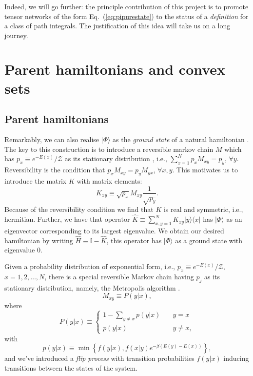 \documentclass[twocolumn,lengthcheck,superscriptaddress]{revtex4-1}
\theoremstyle{definition}
\theoremstyle{remark}
\begin{document}
Indeed, we will go further: the principle contribution of this project is to promote tensor networks of the form Eq.~(\ref{eq:pipurestate}) to the status of a \emph{definition} for a class of path integrals. The justification of this idea will take us on a long journey.




\section{Parent hamiltonians and convex sets}

\subsection{Parent hamiltonians}
Remarkably, we can also realise $|\Phi\rangle$ as the \emph{ground state} of a natural hamiltonian \cite{ardonne:2004a, verstraete:2006a, perez-garcia:2008a, horava:2008a}. The key to this construction is to introduce a reversible markov chain $M$ which has $p_x \equiv  e^{-E(x)}/\mathcal{Z}$ as its stationary distribution \cite{norris:1997a}, i.e., $\sum_{x=1}^N p_xM_{xy} = p_y$, $\forall y$. Reversibility is the condition that $p_x M_{xy} = p_yM_{yx}$, $\forall x,y$. This motivates us to introduce the  matrix $K$ with matrix elements:
\begin{equation}
	K_{xy} \equiv \sqrt{p_x} M_{xy} \frac{1}{\sqrt{p_y}}.
\end{equation}
Because of the reversibility condition we find that $K$ is real and symmetric, i.e., hermitian. Further, we have that operator $\widehat{K} \equiv  \sum_{x,y=1}^N K_{xy}|y\rangle \langle x|$ has $|\Phi\rangle$ as an eigenvector corresponding to its largest eigenvalue. We obtain our desired hamiltonian by writing $\widehat{H} \equiv \mathbb{I} - \widehat{K}$, this operator has $|\Phi\rangle$ as a ground state with eigenvalue $0$.

Given a probability distribution of exponential form, i.e., $p_x \equiv  e^{-E(x)}/\mathcal{Z}$, $x=1, 2, \ldots, N$, there is a special reversible Markov chain having $p_j$ as its stationary distribution, namely, the Metropolis algorithm \cite{metropolis:1953a}. 
\begin{equation}
	M_{xy} \equiv P(y|x),
\end{equation}
where
\begin{equation}
	P(y|x) \equiv \begin{cases} 1 - \sum_{y\not = x} p(y|x) &\quad y=x \\
	p(y|x) &\quad y \not= x,\end{cases}
\end{equation}
with
\begin{equation}
	p(y|x) \equiv  \min\left\{f(y|x), f(x|y)e^{-\beta (E(y)-E(x))}\right\},
\end{equation}
and we've introduced a \emph{flip process} with transition probabilities $f(y|x)$ inducing transitions between the states of the system.
\end{document}
